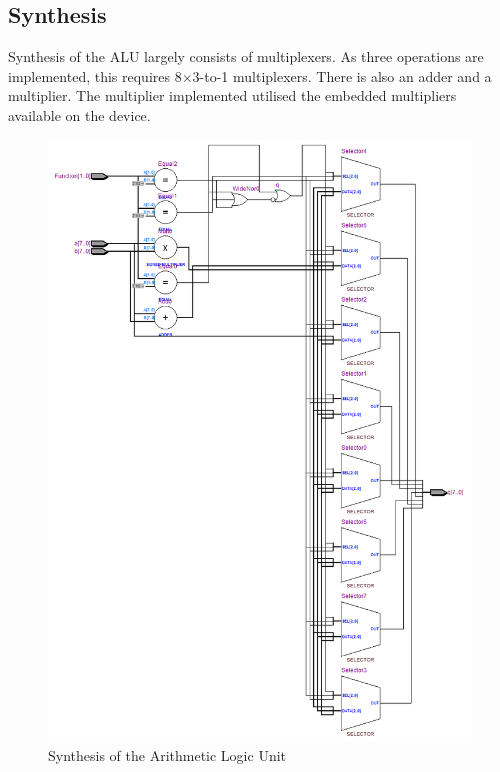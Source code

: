 \subsection{Synthesis}

Synthesis of the ALU largely consists of multiplexers. 
As three operations are implemented, this requires 8$\times$3-to-1 multiplexers. 
There is also an adder and a multiplier. 
The multiplier implemented utilised the embedded multipliers available on the device.

\begin{figure}
\includegraphics[height=\textheight-1cm]{Figures/alusynth.png}
\caption{Synthesis of the Arithmetic Logic Unit}
\label{fig:alusynth}
\end{figure}
